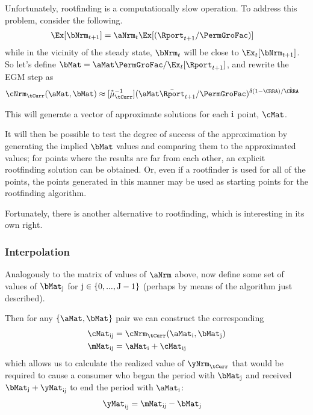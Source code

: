 \documentclass[./SolvingMicroDSOPs]{subfiles}
\begin{document}
{  Unfortunately, rootfinding is a computationally slow operation.  To address this problem, consider the following.
  \begin{align}
    \Ex[\bNrm_{t+1}] & = \aNrm_{t}\Ex[(\Rport_{t+1}/\PermGroFac)]
  \end{align}
  while in the vicinity of the steady state, $\bNrm_{t}$ will be close to $\Ex_{t}[\bNrm_{t+1}]$.  So let's define $\bMat= \aMat \PermGroFac/\Ex_{t}[\Rport_{t+1}]$, and rewrite the EGM step as 
  \begin{align*}
    \mathfrak{\cNrm}_{\tCurr}(\aMat,\bMat) & \approx \muInvVect(\aMat \bar{\Rport}_{t+1}/\PermGroFac)^{\wealthU(1-\CRRA)/\grave{\CRRA}}
  \end{align*}
  
  This will generate a vector of approximate solutions for each $\mathrm{i}$ point, $\cMat$.  %
  
  It will then be possible to test the degree of success of the approximation by generating the implied $\bMat$ values and comparing them to the approximated values; for points where the results are far from each other, an explicit rootfinding solution can be obtained.  Or, even if a rootfinder is used for all of the points, the points generated in this manner may be used as starting points for the rootfinding algorithm.
  
  Fortunately, there is another alternative to rootfinding, which is interesting in its own right.  
  \subsubsection{Interpolation}
  
  Analogously to the matrix of values of $\aNrm$ above, now define some set of values of $\bMat_{\bIdx}$ for $\mathrm{j} \in \{0,...,\mathrm{J}-1\}$ (perhaps by means of the algorithm just described).
  
  Then for any $\{\aMat,\bMat\}$ pair we can construct the corresponding
  \begin{align}
    \cMat_{\aIdx\bIdx} & = \mathfrak{\cNrm}_{\tCurr}(\aMat_{\aIdx},\bMat_{\bIdx})
    \\ \mMat_{\aIdx\bIdx} & = \aMat_{\aIdx}+\cMat_{\aIdx\bIdx}                       
  \end{align}
  which allows us to calculate the realized value of $\yNrm_{\tCurr}$ that would be required to cause a consumer who began the period with $\bMat_{\bIdx}$ and received $\bMat_{\bIdx}+\yMat_{\aIdx\bIdx}$ to end the period with $\aMat_{\aIdx}$:
  \begin{align}
    \yMat_{\aIdx\bIdx} & = \mMat_{\aIdx\bIdx}-\bMat_{\bIdx}
  \end{align}
  
}
\end{document}

